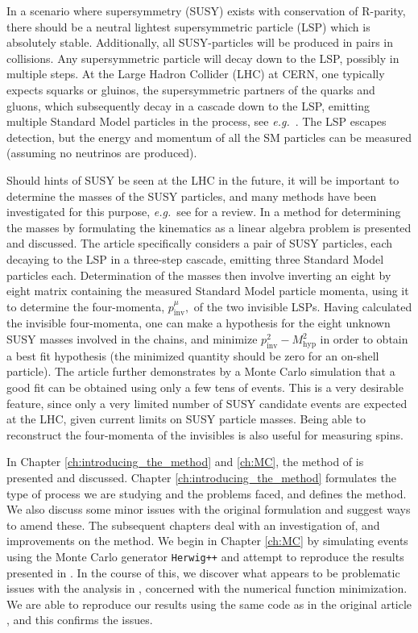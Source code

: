 \documentclass[twoside,english]{uiofysmaster}
\begin{document}
In a scenario where supersymmetry (SUSY) exists with conservation of R-parity, there should be a neutral lightest supersymmetric particle (LSP) which is absolutely stable. Additionally, all SUSY-particles will be produced in pairs in collisions. Any supersymmetric particle will decay down to the LSP, possibly in multiple steps. At the Large Hadron Collider (LHC) at CERN, one typically expects squarks or gluinos, the supersymmetric partners of the quarks and gluons, which subsequently decay in a cascade down to the LSP, emitting multiple Standard Model particles in the process, see {\it e.g.}~\cite{Martin:1997ns}. The LSP escapes detection, but the energy and momentum of all the SM particles can be measured (assuming no neutrinos are produced).

Should hints of SUSY be seen at the LHC in the future, it will be important to determine the masses of the SUSY particles, and many methods have been investigated for this purpose, {\it e.g.}~see \cite{Barr:2010zj} for a review. In \cite{Webber:2009vm} a method for determining the masses by formulating the kinematics as a linear algebra problem is presented and discussed. The article specifically considers a pair of SUSY particles, each decaying to the LSP in a three-step cascade, emitting three Standard Model particles each. Determination of the masses then involve inverting an eight by eight matrix containing the measured Standard Model particle momenta, using it to determine the four-momenta, $p^\mu_\mathrm{inv},$ of the two invisible LSPs. Having calculated the invisible four-momenta, one can make a hypothesis for the eight unknown SUSY masses involved in the chains, and minimize $p^2_\mathrm{inv}-M^2_\mathrm{hyp}$ in order to obtain a best fit hypothesis (the minimized quantity should be zero for an on-shell particle). The article further demonstrates by a Monte Carlo simulation that a good fit can be obtained using only a few tens of events. This is a very desirable feature, since only a very limited number of SUSY candidate events are  expected at the LHC, given current limits on SUSY particle masses. Being able to reconstruct the four-momenta of the invisibles is also useful for measuring spins.

In Chapter \ref{ch:introducing_the_method} and \ref{ch:MC}, the method of \cite{Webber:2009vm} is presented and discussed. Chapter \ref{ch:introducing_the_method} formulates the type of process we are studying and the problems faced, and defines the method. We also discuss some minor issues with the original formulation and suggest ways to amend these. The subsequent chapters deal with an investigation of, and improvements on the method. We begin in Chapter \ref{ch:MC} by simulating events using the Monte Carlo generator {\tt Herwig++} and attempt to reproduce the results presented in \cite{Webber:2009vm}. In the course of this, we discover what appears to be problematic issues with the analysis in \cite{Webber:2009vm}, concerned with the numerical function minimization. We are able to reproduce our results using the same code as in the original article \cite{Webber:epost}, and this confirms the issues.
\end{document}
